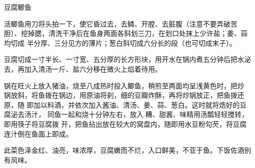 \begin{recipe}{豆腐鲫鱼}

\ingredients


\preparation

\step 活鲫鱼用刀将头拍一下，使它昏过去，去鳞、开膛、去脏腹（注意不要弄破苦
胆）、挖掉腮，清洗干净后在鱼身两面各斜划三刀，在划口处抹上少许盐；姜、蒜均切成
半分厚、三分见方的薄片；葱白斜切成六分长的段（也可切成末子）。

\step 豆腐切成一寸半长、一寸宽、五分厚的长方形块，用开水在锅内煮五分钟后把水泌
去，再加入清汤一斤、盐六分移在微火上焰着待用。

\step 锅在旺火上放入猪油，烧至八成热时投入鲫鱼，稍煎至两面均呈浅黄色时，把炒
锅放斜，将鱼拨在锅边，用原油将刹，细的豆瓣炸酥，再将炒锅放正，把鱼拨还原，随
即加以料酒，并依次加入酱油、清汤、姜、蒜、葱白。这时就将焅好的豆腐泌去汤汁，
同鱼一起和烧十分钟左右，放入𰪿糟、甜酱、味精用汤瓢轻轻搅转，即用筷子将豆腐拨
开，把鱼拈出放在较大的窝盘内，随即用水豆粉勾芡，将豆腐连汁倒在鱼面上即成。

\features

此菜色泽金红、油亮，味浓厚，豆腐嫩而不烂，入口鲜美，不亚于鱼。下饭佐酒别有风味。

\end{recipe}

